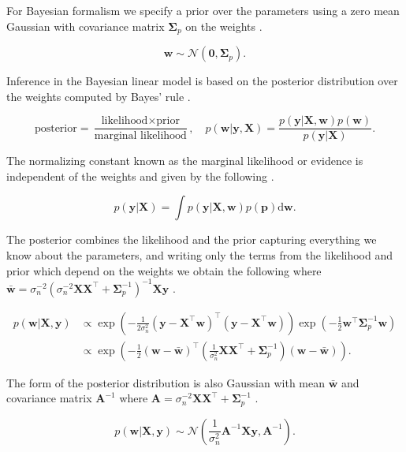 \documentclass[../../../main.tex]{subfiles}
\begin{document}
For Bayesian formalism we specify a prior over the parameters using a zero mean Gaussian with covariance matrix $\bm{\Sigma}_p$ on the weights \autocite{Rasmussen2005}.

\begin{equation}
\bm{w} \sim \mathcal{N}(\bm{0},\bm{\Sigma}_p).
\end{equation}

Inference in the Bayesian linear model is based on the posterior distribution over the weights computed by Bayes' rule \autocite{Rasmussen2005}.

\[
\text{posterior} = \frac{\text{likelihood}\times\text{prior}}{\text{marginal likelihood}}, \quad p(\bm{w}|\bm{y},\bm{X}) = \frac{p(\bm{y}|\bm{X},\bm{w})p(\bm{w})}{p(\bm{y}|\bm{X})}.
\]

The normalizing constant known as the marginal likelihood or evidence is independent of the weights and given by the following \autocite{Rasmussen2005}.

\begin{equation}
p(\bm{y}|\bm{X}) = \int p(\bm{y}|\bm{X},\bm{w})p(\bm{p})\mathrm{d}\bm{w}.
\end{equation}

The posterior combines the likelihood and the prior capturing everything we know about the parameters, and writing only the terms from the likelihood and prior which depend on the weights we obtain the following where $\bm{\bar{w}}=\sigma_n^{-2}(\sigma_n^{-2}\bm{X}\bm{X}^\top+\bm{\Sigma}_p^{-1})^{-1}\bm{X}\bm{y}$ \autocite{Rasmussen2005}.

\begin{equation}
\begin{split}
p(\bm{w}|\bm{X},\bm{y}) &\propto \exp\left(-\frac{1}{2\sigma_n^2}(\bm{y}-\bm{X}^\top\bm{w})^\top(\bm{y}-\bm{X}^\top\bm{w})\right) \exp\left(-\frac{1}{2}\bm{w}^\top\bm{\Sigma}_p^{-1}\bm{w}\right) \\
&\propto \exp\left(-\frac{1}{2}(\bm{w}-\bm{\bar{w}})^\top(\frac{1}{\sigma_n^2}\bm{X}\bm{X}^\top+\bm{\Sigma}_p^{-1})(\bm{w}-\bm{\bar{w}})\right).
\end{split}
\end{equation}

The form of the posterior distribution is also Gaussian with mean $\bm{\bar{w}}$ and covariance matrix $\bm{A}^{-1}$ where $\bm{A}=\sigma_n^{-2}\bm{X}\bm{X}^\top+\bm{\Sigma}_p^{-1}$ \autocite{Rasmussen2005}.

\begin{equation}
p(\bm{w}|\bm{X},\bm{y}) \sim \mathcal{N}\left(\frac{1}{\sigma_n^2}\bm{A}^{-1}\bm{X}\bm{y},\bm{A}^{-1}\right).
\end{equation}
\end{document}
